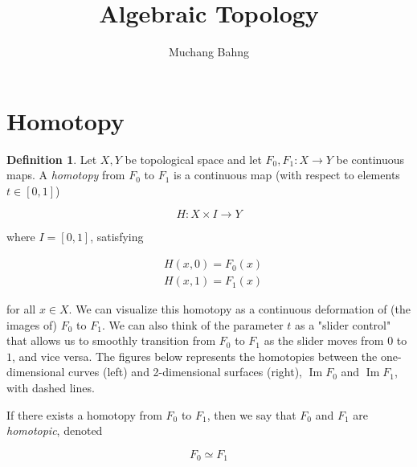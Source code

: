 \documentclass{article}
\DeclareMathOperator{\im}{Im}
\theoremstyle{remark}
\theoremstyle{definition}
\newtheorem{definition}{Definition}[section]
\begin{document}
\pagestyle{fancy}

\cfoot{\thepage / \pageref{LastPage}}

\title{Algebraic Topology}
\author{Muchang Bahng}

\maketitle
\tableofcontents
\pagebreak 

\section{Homotopy}

  \begin{definition}
    Let $X, Y$ be topological space and let $F_0, F_1: X \longrightarrow Y$ be continuous maps. A \textit{homotopy} from $F_0$ to $F_1$ is a continuous map (with respect to elements $t \in [0,1]$)

      \[H: X \times I \longrightarrow Y\]

    where $I = [0,1]$, satisfying

    \begin{align*}
      & H(x, 0) = F_0 (x) \\
      & H(x, 1) = F_1 (x) 
    \end{align*}

    for all $x \in X$. We can visualize this homotopy as a continuous deformation of (the images of) $F_0$ to $F_1$. We can also think of the parameter $t$ as a "slider control" that allows us to smoothly transition from $F_0$ to $F_1$ as the slider moves from $0$ to $1$, and vice versa. The figures below represents the homotopies between the one-dimensional curves (left) and 2-dimensional surfaces (right), $\im{F_0}$ and $\im{F_1}$, with dashed lines. 

    \begin{center}
    \end{center}

    If there exists a homotopy from $F_0$ to $F_1$, then we say that $F_0$ and $F_1$ are \textit{homotopic}, denoted

    \[F_0 \simeq F_1\]
  \end{definition}
\end{document}
